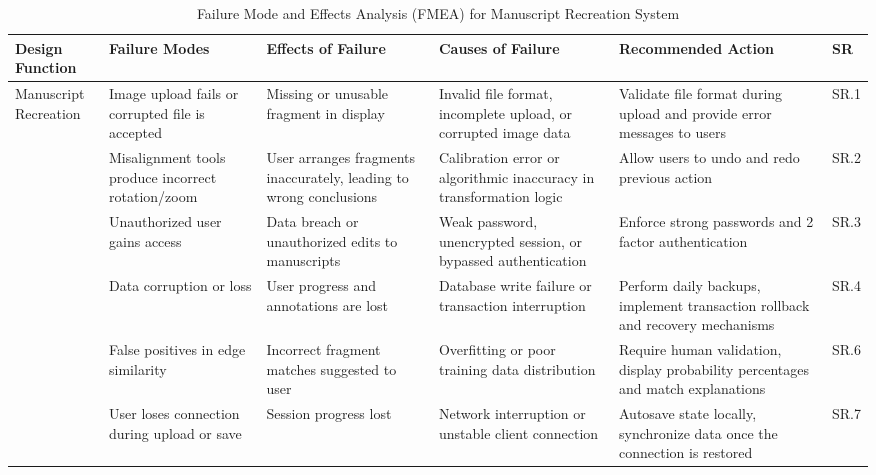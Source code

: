 \documentclass{article}
\begin{document}
\begin{table}[H]
\centering
\scriptsize
\caption{Failure Mode and Effects Analysis (FMEA) for Manuscript Recreation System}
\begin{tabularx}{\textwidth}{p{2.5cm} X X X X l}
\toprule
\textbf{Design Function} & \textbf{Failure Modes} & \textbf{Effects of Failure} & \textbf{Causes of Failure} & \textbf{Recommended Action} & \textbf{SR} \\
\midrule

\multirow{7}{*}{\parbox[t]{2cm}{Manuscript \\ Recreation}}
& Image upload fails or corrupted file is accepted
& Missing or unusable fragment in display
& Invalid file format, incomplete upload, or corrupted image data
& Validate file format during upload and provide error messages to users
& SR.1 \\

& Misalignment tools produce incorrect rotation/zoom
& User arranges fragments inaccurately, leading to wrong conclusions
& Calibration error or algorithmic inaccuracy in transformation logic
& Allow users to undo and redo previous action
& SR.2 \\

& Unauthorized user gains access
& Data breach or unauthorized edits to manuscripts
& Weak password, unencrypted session, or bypassed authentication
& Enforce strong passwords and 2 factor authentication
& SR.3 \\

& Data corruption or loss
& User progress and annotations are lost
& Database write failure or transaction interruption
& Perform daily backups, implement transaction rollback and recovery mechanisms
& SR.4 \\

& False positives in edge similarity
& Incorrect fragment matches suggested to user
& Overfitting or poor training data distribution
& Require human validation, display probability percentages and match explanations
& SR.6 \\

& User loses connection during upload or save
& Session progress lost
& Network interruption or unstable client connection
& Autosave state locally, synchronize data once the connection is restored
& SR.7 \\

\bottomrule
\end{tabularx}
\end{table}
\end{document}

